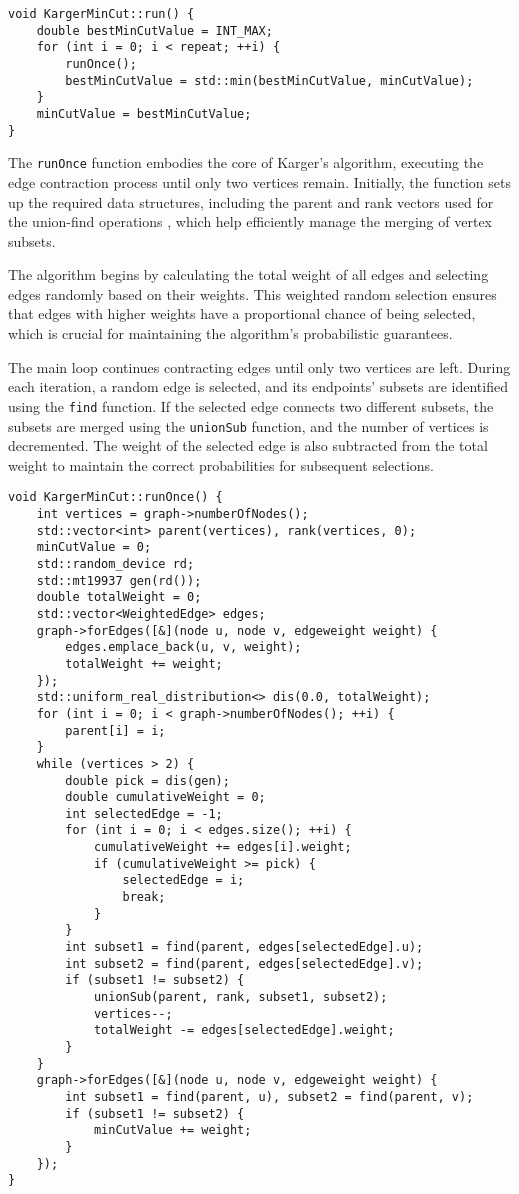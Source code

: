 \begin{verbatim}
void KargerMinCut::run() {
    double bestMinCutValue = INT_MAX;
    for (int i = 0; i < repeat; ++i) {
        runOnce();
        bestMinCutValue = std::min(bestMinCutValue, minCutValue);
    }
    minCutValue = bestMinCutValue;
}
\end{verbatim}

The \texttt{runOnce} function embodies the core of Karger's algorithm, executing the edge contraction process until only two vertices remain. Initially, the function sets up the required data structures, including the parent and rank vectors used for the union-find operations \cite{galler1964}, which help efficiently manage the merging of vertex subsets.

The algorithm begins by calculating the total weight of all edges and selecting edges randomly based on their weights. This weighted random selection ensures that edges with higher weights have a proportional chance of being selected, which is crucial for maintaining the algorithm's probabilistic guarantees. 

The main loop continues contracting edges until only two vertices are left. During each iteration, a random edge is selected, and its endpoints' subsets are identified using the \texttt{find} function. If the selected edge connects two different subsets, the subsets are merged using the \texttt{unionSub} function, and the number of vertices is decremented. The weight of the selected edge is also subtracted from the total weight to maintain the correct probabilities for subsequent selections.

\begin{verbatim}
void KargerMinCut::runOnce() {
    int vertices = graph->numberOfNodes();
    std::vector<int> parent(vertices), rank(vertices, 0);
    minCutValue = 0;
    std::random_device rd;
    std::mt19937 gen(rd());
    double totalWeight = 0;
    std::vector<WeightedEdge> edges;
    graph->forEdges([&](node u, node v, edgeweight weight) {
        edges.emplace_back(u, v, weight);
        totalWeight += weight;
    });
    std::uniform_real_distribution<> dis(0.0, totalWeight);
    for (int i = 0; i < graph->numberOfNodes(); ++i) {
        parent[i] = i;
    }
    while (vertices > 2) {
        double pick = dis(gen);
        double cumulativeWeight = 0;
        int selectedEdge = -1;
        for (int i = 0; i < edges.size(); ++i) {
            cumulativeWeight += edges[i].weight;
            if (cumulativeWeight >= pick) {
                selectedEdge = i;
                break;
            }
        }
        int subset1 = find(parent, edges[selectedEdge].u);
        int subset2 = find(parent, edges[selectedEdge].v);
        if (subset1 != subset2) {
            unionSub(parent, rank, subset1, subset2);
            vertices--;
            totalWeight -= edges[selectedEdge].weight;
        }
    }
    graph->forEdges([&](node u, node v, edgeweight weight) {
        int subset1 = find(parent, u), subset2 = find(parent, v);
        if (subset1 != subset2) {
            minCutValue += weight;
        }
    });
}
\end{verbatim}



